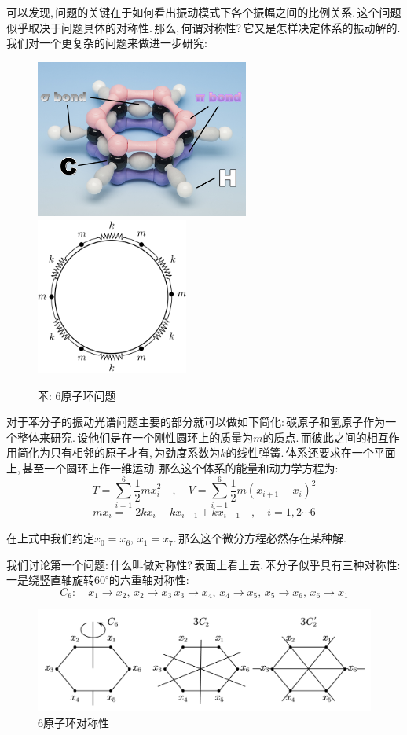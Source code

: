 可以发现,\,问题的关键在于如何看出振动模式下各个振幅之间的比例关系.\,这个问题似乎取决于问题具体的对称性.\,那么,\,何谓对称性?\,它又是怎样决定体系的振动解的.\,我们对一个更复杂的问题来做进一步研究:

\begin{figure}[H]
\centering
\includegraphics[width=7cm]{image/6-3-10.png}
\hspace{2cm}
\includegraphics[width=5cm]{image/6-3-8.png}
\caption{苯: 6原子环问题}
\end{figure}

对于苯分子的振动光谱问题主要的部分就可以做如下简化:\,碳原子和氢原子作为一个整体来研究.\,设他们是在一个刚性圆环上的质量为$m$的质点.\,而彼此之间的相互作用简化为只有相邻的原子才有,\,为劲度系数为$k$的线性弹簧.\,体系还要求在一个平面上,\,甚至一个圆环上作一维运动.\,那么这个体系的能量和动力学方程为:
\[T=\sum_{i=1}^6 \frac{1}{2}m\dot{x}_i^2\quad,\quad V=\sum_{i=1}^6\frac{1}{2}m(x_{i+1}-x_i)^2\]
\[m\ddot{x}_i=-2kx_i+kx_{i+1}+kx_{i-1}\quad,\quad i=1,2\cdots 6\]

在上式中我们约定$x_0=x_6,\,x_1=x_7$.\,那么这个微分方程必然存在某种解.

我们讨论第一个问题:\,什么叫做对称性?\,表面上看上去,\,苯分子似乎具有三种对称性:\,一是绕竖直轴旋转$60^\circ$的六重轴对称性:
\[C_6:\quad x_1\to x_2,\,x_2\to x_3\,x_3\to x_4,\,x_4\to x_5,\, x_5\to x_6,\,x_6\to x_1\]

\begin{figure}[H]
\centering
\includegraphics[width=14cm]{image/6-3-11.png}
\caption{6原子环对称性}
\end{figure}

